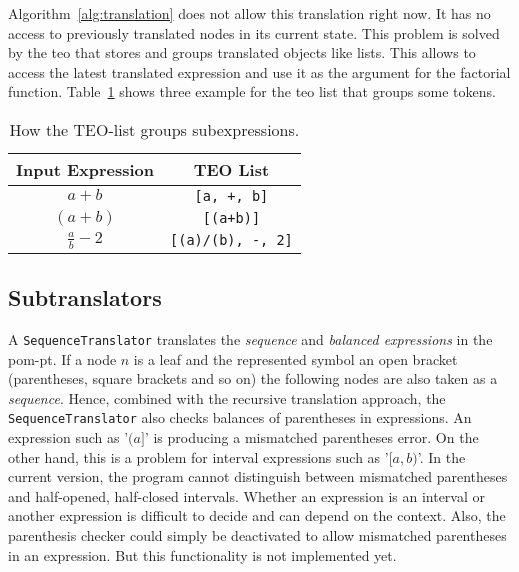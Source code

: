 Algorithm~\ref{alg:translation} does not allow this translation right now. It has no access to previously translated nodes in its current state. This problem is solved by the \gls*{teo} that stores and groups translated objects like lists. This allows to access the latest translated expression and use it as the argument for the factorial function. Table~\ref{tab:teo-list} shows three example for the \gls*{teo} list that groups some tokens.

\begin{table}[ht]
\centering
\begin{tabular}{cc}
	\hline
	Input Expression & TEO List\\
	\hline
	$a+b$ & \verb|[a, +, b]|\\
	$(a+b)$ & \verb|[(a+b)]|\\
	$\frac{a}{b}-2$ & \verb|[(a)/(b), -, 2]|\\
	\hline
\end{tabular}
\caption{How the TEO-list groups subexpressions.}
\label{tab:teo-list}
\end{table}

\subsection{Subtranslators}\label{sec:subtranslators}

A \verb|SequenceTranslator| translates the \textit{sequence} and \textit{balanced expressions} in the \gls*{pom-pt}. If a node $n$ is a leaf and the represented symbol an open bracket (parentheses, square brackets and so on) the following nodes are also taken as a \textit{sequence}. Hence, combined with the recursive translation approach, the \verb|SequenceTranslator| also checks balances of parentheses in expressions. An expression such as '$(a]$' is producing a mismatched parentheses error. On the other hand, this is a problem for interval expressions such as '$[a,b)$'. In the current version, the program cannot distinguish between mismatched parentheses and half-opened, half-closed intervals. Whether an expression is an interval or another expression is difficult to decide and can depend on the context. Also, the parenthesis checker could simply be deactivated to allow mismatched parentheses in an expression. But this functionality is not implemented yet.

